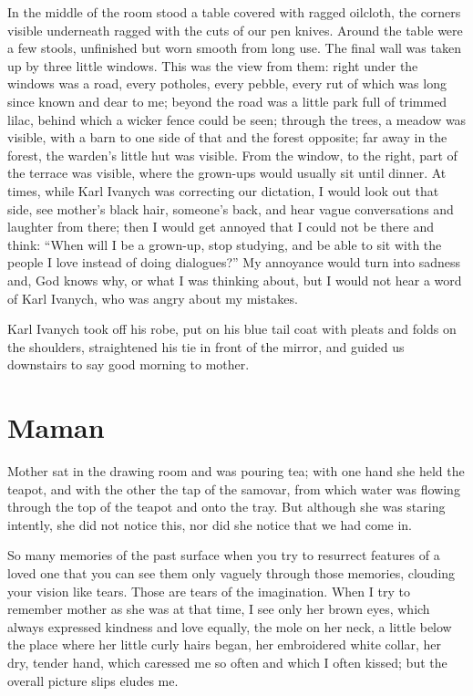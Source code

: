 In the middle of the room stood a table covered with ragged oilcloth, the corners visible underneath ragged with the cuts of our pen knives. Around the table were a few stools, unfinished but worn smooth from long use. The final wall was taken up by three little windows. This was the view from them: right under the windows was a road, every potholes, every pebble, every rut of which was long since known and dear to me; beyond the road was a little park full of trimmed lilac, behind which a wicker fence could be seen; through the trees, a meadow was visible, with a barn to one side of that and the forest opposite; far away in the forest, the warden's little hut was visible. From the window, to the right, part of the terrace was visible, where the grown-ups would usually sit until dinner. At times, while Karl Ivanych was correcting our dictation, I would look out that side, see mother's black hair, someone's back, and hear vague conversations and laughter from there; then I would get annoyed that I could not be there and think: ``When will I be a grown-up, stop studying, and be able to sit with the people I love instead of doing dialogues?'' My annoyance would turn into sadness and, God knows why, or what I was thinking about, but I would not hear a word of Karl Ivanych, who was angry about my mistakes. %

Karl Ivanych took off his robe, put on his blue tail coat with pleats and folds  on the shoulders, straightened his tie in front of the mirror, and guided us downstairs to say good morning to mother.

\chapter{Maman} %

Mother sat in the drawing room and was pouring tea; with one hand she held the teapot, and with the other the tap of the samovar, from which water was flowing through the top of the teapot and onto the tray. But although she was staring intently, she did not notice this, nor did she notice that we had come in.

So many memories of the past surface when you try to resurrect features of a loved one that you can see them only vaguely through those memories, clouding your vision like tears. Those are tears of the imagination. When I try to remember mother as she was at that time, I see only her brown eyes, which always expressed kindness and love equally, the mole on her neck, a little below the place where her little curly hairs began, her embroidered white collar, her dry, tender hand, which caressed me so often and which I often kissed; but the overall picture slips eludes me.

